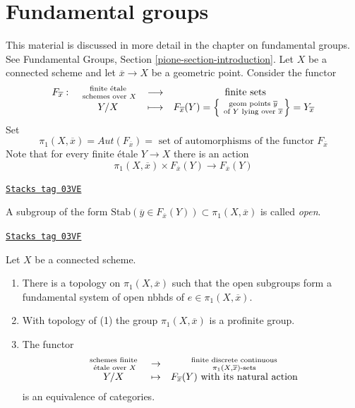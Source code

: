 \section{Fundamental groups}
\label{trace-section-fundamental-groups}
This material is discussed in more detail in the chapter on
fundamental groups. See
Fundamental Groups, Section \ref{pione-section-introduction}.
Let $X$ be a connected scheme and let $\overline{x}\to X$ be a
geometric point. Consider the functor
$$
\begin{matrix}
F_{\overline{x}}: &
\text{ finite \'etale } \atop \text{ schemes over } X &
\longrightarrow & \text{ finite sets} \\
&
Y/X &
\longmapsto &
F_{\overline{x}}(Y) =
\left\{\text{ geom points }\overline y \atop \text{ of } Y
\text{ lying over }\overline{x}\right\} = Y_{\overline{x}}
\end{matrix}
$$
Set
$$
\pi_1(X, \overline{x})
=
Aut(F_{\overline{x}})
=
\text{ set of automorphisms of the functor }F_{\overline{x}}
$$
Note that for every finite \'etale $Y \to X$ there is an action
$$
\pi_1(X, \overline{x}) \times F_{\overline{x}}(Y) \to F_{\overline{x}}(Y)
$$

\begin{definition}[Open]
\label{trace-definition-open}
\href{https://stacks.math.columbia.edu/tag/03VE}{\texttt{Stacks tag 03VE}}

A subgroup of the form
$\text{Stab}(\overline y\in F_{\overline{x}}(Y))\subset \pi_1(X, \overline{x})$
is called {\it open}.
\end{definition}

\begin{theorem}[Grothendieck]

\label{trace-theorem-fundamental-group}
\href{https://stacks.math.columbia.edu/tag/03VF}{\texttt{Stacks tag 03VF}}

Let $X$ be a connected scheme.
\begin{enumerate}
\item There is a topology on $\pi_1(X, \overline{x})$ such that the open
subgroups form a fundamental system of open nbhds of $e\in \pi_1(X, \overline
x)$.
\item With topology of (1) the group
$\pi_1(X, \overline{x})$ is a profinite group.
\item The functor
$$
\begin{matrix}
\text{ schemes finite } \atop \text{ \'etale over }X & \to &
\text{ finite discrete continuous } \atop \pi_1(X, \overline{x})\text{-sets}\\
Y / X& \mapsto & F_{\overline{x}}(Y) \text{ with its natural action}
\end{matrix}
$$
is an equivalence of categories.
\end{enumerate}
\end{theorem}

